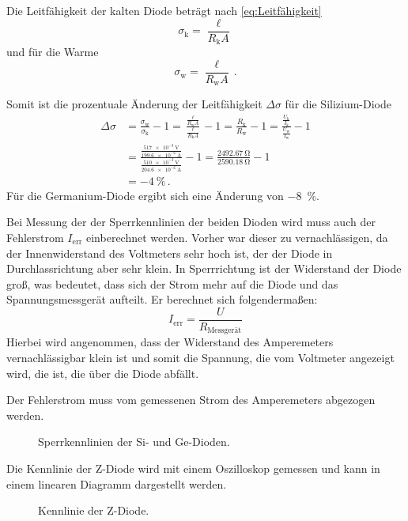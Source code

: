 \documentclass[
12pt,
a4paper,
bibliography=totocnumbered, %
BCOR=1cm, %
oneside, %
]{scrartcl}
\begin{document}
Die Leitfähigkeit der kalten Diode beträgt nach \autoref{eq:Leitfähigkeit}
\begin{equation}
	\sigma_{\text{k}} = \frac{\ell}{R_{\text{k}}A}
\end{equation}
und für die Warme
\begin{equation}
	\sigma_{\text{w}} = \frac{\ell}{R_{\text{w}}A} \,.
\end{equation}

Somit ist die prozentuale Änderung der Leitfähigkeit \(\Delta \sigma\) für die Silizium-Diode
\begin{align*}
	\Delta \sigma &= \frac{\sigma_{\text{w}}}{\sigma_{\text{k}}} -1 = \frac{\frac{\ell}{R_{\text{w}}A}}{\frac{\ell}{R_{\text{k}}A}} -1 = \frac{R_{\text{k}}}{R_{\text{w}}} -1 = \frac{\frac{U_{\text{k}}}{I_\text{k}}}{\frac{U_{\text{w}}}{I_{\text{w}}}} -1\\
	&= \frac{\frac{\qty{517e-3}{\volt}}{\qty{199,6e-6}{\ampere}}}{\frac{\qty{510e-3}{\volt}}{\qty{204,6e-6}{\ampere}}} -1 = \frac{\qty{2492,67}{\ohm}}{\qty{2590,18}{\ohm}} -1\\
	&= \qty{-4}{\percent} \,.
\end{align*}
Für die Germanium-Diode ergibt sich eine Änderung von \qty{-8}{\percent}.

Bei Messung der der Sperrkennlinien der beiden Dioden wird muss auch der Fehlerstrom \(I_{\text{err}}\) einberechnet werden. Vorher war dieser zu vernachlässigen, da der Innenwiderstand des Voltmeters sehr hoch ist, der der Diode in Durchlassrichtung aber sehr klein. In Sperrrichtung ist der Widerstand der Diode groß, was bedeutet, dass sich der Strom mehr auf die Diode und das Spannungsmessgerät aufteilt. Er berechnet sich folgendermaßen:
\begin{equation*}
	I_{\text{err}} = \frac{U}{R_{\text{Messgerät}}}
\end{equation*}
Hierbei wird angenommen, dass der Widerstand des Amperemeters vernachlässigbar klein ist und somit die Spannung, die vom Voltmeter angezeigt wird, die ist, die über die Diode abfällt.

Der Fehlerstrom muss vom gemessenen Strom des Amperemeters abgezogen werden.
\begin{figure}[H]
	\caption{Sperrkennlinien der Si- und Ge-Dioden.}
	\label{fig:Sperrkennlinien}
\end{figure}

Die Kennlinie der Z-Diode wird mit einem Oszilloskop gemessen und kann in einem linearen Diagramm dargestellt werden.
\begin{figure}[H]
	\caption{Kennlinie der Z-Diode.}
	\label{fig:KennlinieZ}
\end{figure}
\end{document}
